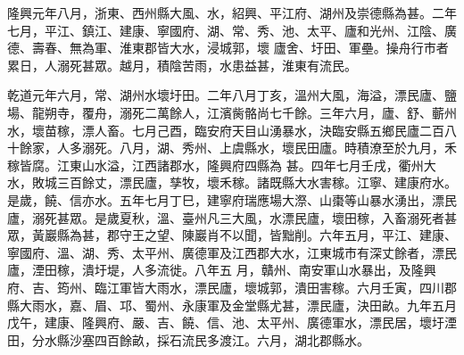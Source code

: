 \begin{pinyinscope}
 隆興元年八月，浙東、西州縣大風、水，紹興、平江府、湖州及崇德縣為甚。二年七月，平江、鎮江、建康、寧國府、湖、常、秀、池、太平、廬和光州、江陰、廣德、壽春、無為軍、淮東郡皆大水，浸城郭，壞
 廬舍、圩田、軍壘。操舟行市者累日，人溺死甚眾。越月，積陰苦雨，水患益甚，淮東有流民。



 乾道元年六月，常、湖州水壞圩田。二年八月丁亥，溫州大風，海溢，漂民廬、鹽場、龍朔寺，覆舟，溺死二萬餘人，江濱胔骼尚七千餘。三年六月，廬、舒、蘄州水，壞苗稼，漂人畜。七月己酉，臨安府天目山湧暴水，決臨安縣五鄉民廬二百八十餘家，人多溺死。八月，湖、秀州、上虞縣水，壞民田廬。時積潦至於九月，禾稼皆腐。江東山水溢，江西諸郡水，隆興府四縣為
 甚。四年七月壬戌，衢州大水，敗城三百餘丈，漂民廬，孳牧，壞禾稼。諸既縣大水害稼。江寧、建康府水。是歲，饒、信亦水。五年七月丁巳，建寧府瑞應場大漈、山棗等山暴水湧出，漂民廬，溺死甚眾。是歲夏秋，溫、臺州凡三大風，水漂民廬，壞田稼，入畜溺死者甚眾，黃巖縣為甚，郡守王之望、陳巖肖不以聞，皆黜削。六年五月，平江、建康、寧國府、溫、湖、秀、太平州、廣德軍及江西郡大水，江東城市有深丈餘者，漂民廬，湮田稼，潰圩堤，人多流徙。八年五
 月，贛州、南安軍山水暴出，及隆興府、吉、筠州、臨江軍皆大雨水，漂民廬，壞城郭，潰田害稼。六月壬寅，四川郡縣大雨水，嘉、眉、邛、蜀州、永康軍及金堂縣尤甚，漂民廬，決田畝。九年五月戊午，建康、隆興府、嚴、吉、饒、信、池、太平州、廣德軍水，漂民居，壞圩湮田，分水縣沙塞四百餘畝，採石流民多渡江。六月，湖北郡縣水。




\end{pinyinscope}
